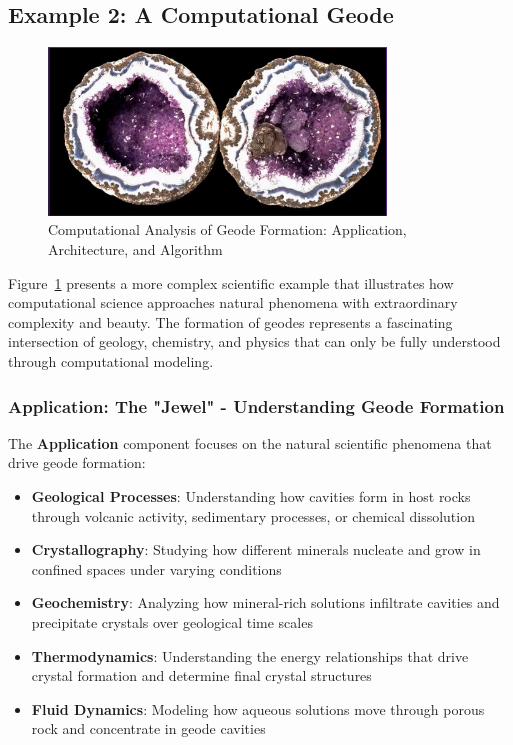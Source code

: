 \subsection{Example 2: A Computational Geode}

\begin{figure}[h]
 \centering
 \includegraphics[width=0.8\textwidth]{images/computational_geode.png}
 \caption{Computational Analysis of Geode Formation: Application, Architecture, and Algorithm}
 \label{fig:computational_geode}
\end{figure}

Figure~\ref{fig:computational_geode} presents a more complex scientific example that illustrates how computational science approaches natural phenomena with extraordinary complexity and beauty. The formation of geodes represents a fascinating intersection of geology, chemistry, and physics that can only be fully understood through computational modeling.

\subsubsection{Application: The "Jewel" - Understanding Geode Formation}

The \textbf{Application} component focuses on the natural scientific phenomena that drive geode formation:

\begin{itemize}
    \item \textbf{Geological Processes}: Understanding how cavities form in host rocks through volcanic activity, sedimentary processes, or chemical dissolution
    \item \textbf{Crystallography}: Studying how different minerals nucleate and grow in confined spaces under varying conditions
    \item \textbf{Geochemistry}: Analyzing how mineral-rich solutions infiltrate cavities and precipitate crystals over geological time scales
    \item \textbf{Thermodynamics}: Understanding the energy relationships that drive crystal formation and determine final crystal structures
    \item \textbf{Fluid Dynamics}: Modeling how aqueous solutions move through porous rock and concentrate in geode cavities
\end{itemize}

